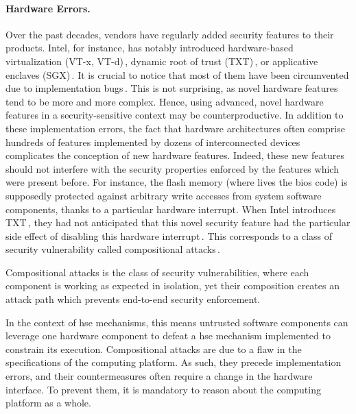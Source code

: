 \paragraph{Hardware Errors.}
%
Over the past decades, vendors have regularly added security features to their
products.
%
Intel, for instance, has notably introduced hardware-based virtualization (VT-x,
VT-d)\,\cite{intel2014manualvt}, dynamic root of trust
(TXT)\,\cite{intel2015txt}, or applicative enclaves
(SGX)\,\cite{intel2014manualsgx,costan2016sgxexplained}.
%
It is crucial to notice that most of them have been circumvented due to
implementation bugs\,\cite{wojtczuk2011txtbug,sang2010iommu}.
%
This is not surprising, as novel hardware features tend to be more and more
complex.
%
Hence, using advanced, novel hardware features in a security-sensitive context
may be counterproductive.
%
In addition to these implementation errors, the fact that hardware architectures
often comprise hundreds of features implemented by dozens of interconnected
devices complicates the conception of new hardware features.
%
Indeed, these new features should not interfere with the security properties
enforced by the features which were present before.
%
For instance, the flash memory (where lives the \ac{bios} code) is supposedly
protected against arbitrary write accesses from system software components,
thanks to a particular hardware interrupt.
%
When Intel introduces TXT\,\cite{intel2015txt}, they had not anticipated that
this novel security feature had the particular side effect of disabling this
hardware interrupt\,\cite{kovah2015senter}.
%
This corresponds to a class of security vulnerability called compositional
attacks\,\cite{wing2003compositionalattack}.

\begin{definition}
  Compositional attacks is the class of security vulnerabilities, where each
  component is working as expected in isolation, yet their composition creates
  an attack path which prevents end-to-end security enforcement.
\end{definition}

In the context of \ac{hse} mechanisms, this means untrusted software components
can leverage one hardware component to defeat a \ac{hse} mechanism implemented
to constrain its execution.
%
%
Compositional attacks are due to a flaw in the specifications of the computing
platform.
%
As such, they precede implementation errors, and their countermeasures often
require a change in the hardware interface.
%
To prevent them, it is mandatory to reason about the computing platform as a
whole.


